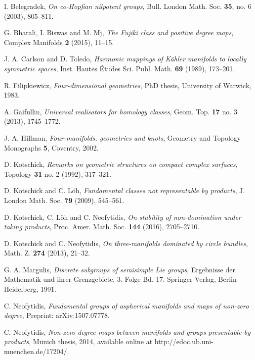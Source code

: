 \documentclass[12pt]{amsart}
\theoremstyle{remark}
\begin{document}
\begin{thebibliography}{10}

I. Belegradek, {\em On co-Hopfian nilpotent groups}, Bull. London Math. Soc. {\bf 35}, no. 6 (2003), 805--811.

G. Bharali, I. Biswas and M. Mj, {\em The Fujiki class and positive degree maps}, Complex Manifolds {\bf 2} (2015), 11--15.

J. A. Carlson and D. Toledo, {\em Harmonic mappings of K\"ahler manifolds to locally symmetric spaces}, Inst. Hautes \'Etudes Sci. Publ. Math. {\bf 69} (1989), 173--201.

R. Filipkiewicz, {\sl Four-dimensional geometries}, PhD thesis, University of Warwick, 1983.

A. Gaifullin, {\em Universal realisators for homology classes}, Geom. Top. {\bf 17} no. 3 (2013), 1745--1772.

J. A. Hillman, {\sl Four-manifolds, geometries and knots}, Geometry and Topology Monographs {\bf 5}, Coventry, 2002.

D. Kotschick, {\em Remarks on geometric structures on compact complex surfaces}, Topology {\bf 31} no. 2 (1992), 317--321.

D. Kotschick and C. L\"oh, {\em Fundamental classes not representable by products}, J. London Math. Soc. {\bf 79} (2009), 545--561.

D. Kotschick, C. L\"oh and C. Neofytidis, {\em On stability of non-domination under taking products}, Proc. Amer. Math. Soc. {\bf 144} (2016), 2705--2710.

D. Kotschick and C. Neofytidis, {\em On three-manifolds dominated by circle bundles}, Math. Z. {\bf 274} (2013), 21--32.

G. A. Margulis, {\sl Discrete subgroups of semisimple Lie groups}, Ergebnisse der Mathematik und ihrer Grenzgebiete, 3. Folge Bd. 17. Springer-Verlag, Berlin-Heidelberg, 1991.

C. Neofytidis, {\em Fundamental groups of aspherical manifolds and maps of non-zero degree}, Preprint: arXiv:1507.07778.

C. Neofytidis, {\sl Non-zero degree maps between manifolds and groups presentable by products}, Munich thesis, 2014, available online at http://edoc.ub.uni-muenchen.de/17204/.


\end{thebibliography}
\end{document}
